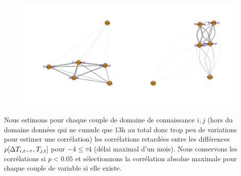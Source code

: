 \begin{figure}
	\includegraphics[width=\linewidth]{Figures/Final/F-reflexivity-kd.jpg}
\end{figure}





Nous estimons pour chaque couple de domaine de connaissance $i,j$ (hors du domaine données qui ne cumule que 13h au total donc trop peu de variations pour estimer une corrélation) les corrélations retardées entre les différences $\rho\!\left[\Delta T_{i,t-\tau},T_{j,t}\right]$ pour $-4 \leq \tau 4$ (délai maximal d'un mois). Nous conservons les corrélations si $p<0.05$ et sélectionnons la corrélation absolue maximale pour chaque couple de variable si elle existe.

